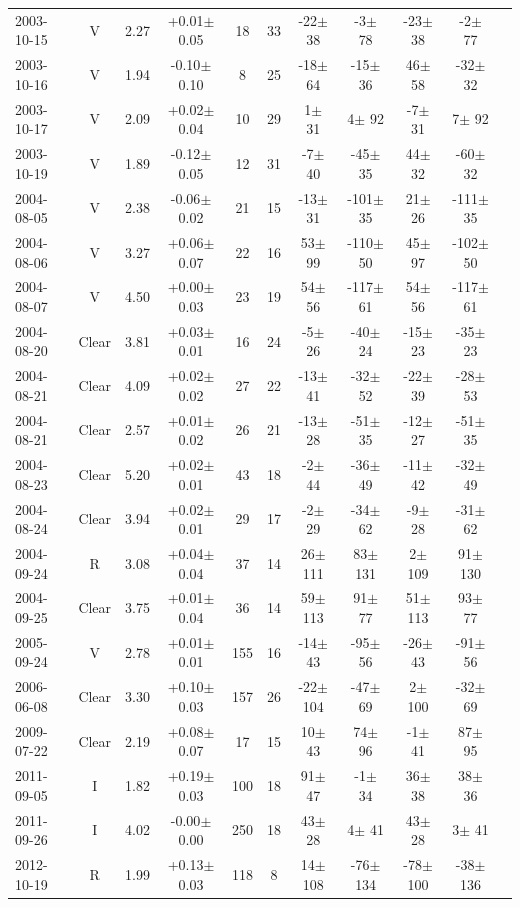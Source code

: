 \documentclass[12pt,a4paper]{report}
\begin{document}
\begin{landscape}
\begin{longtable}{|l|c|c|c|c|c|c|c|c|c|c|}
2003-10-15 & V     & 2.27 & +0.01$\pm$0.05 &  18 &  33 &  -22$\pm$ 38 &   -3$\pm$ 78 &  -23$\pm$ 38 &   -2$\pm$ 77 \\ 
2003-10-16 & V     & 1.94 & -0.10$\pm$0.10 &   8 &  25 &  -18$\pm$ 64 &  -15$\pm$ 36 &   46$\pm$ 58 &  -32$\pm$ 32 \\ 
2003-10-17 & V     & 2.09 & +0.02$\pm$0.04 &  10 &  29 &    1$\pm$ 31 &    4$\pm$ 92 &   -7$\pm$ 31 &    7$\pm$ 92 \\ 
2003-10-19 & V     & 1.89 & -0.12$\pm$0.05 &  12 &  31 &   -7$\pm$ 40 &  -45$\pm$ 35 &   44$\pm$ 32 &  -60$\pm$ 32 \\ 
2004-08-05 & V     & 2.38 & -0.06$\pm$0.02 &  21 &  15 &  -13$\pm$ 31 & -101$\pm$ 35 &   21$\pm$ 26 & -111$\pm$ 35 \\ 
2004-08-06 & V     & 3.27 & +0.06$\pm$0.07 &  22 &  16 &   53$\pm$ 99 & -110$\pm$ 50 &   45$\pm$ 97 & -102$\pm$ 50 \\ 
2004-08-07 & V     & 4.50 & +0.00$\pm$0.03 &  23 &  19 &   54$\pm$ 56 & -117$\pm$ 61 &   54$\pm$ 56 & -117$\pm$ 61 \\ 
2004-08-20 & Clear & 3.81 & +0.03$\pm$0.01 &  16 &  24 &   -5$\pm$ 26 &  -40$\pm$ 24 &  -15$\pm$ 23 &  -35$\pm$ 23 \\ 
2004-08-21 & Clear & 4.09 & +0.02$\pm$0.02 &  27 &  22 &  -13$\pm$ 41 &  -32$\pm$ 52 &  -22$\pm$ 39 &  -28$\pm$ 53 \\ 
2004-08-21 & Clear & 2.57 & +0.01$\pm$0.02 &  26 &  21 &  -13$\pm$ 28 &  -51$\pm$ 35 &  -12$\pm$ 27 &  -51$\pm$ 35 \\ 
2004-08-23 & Clear & 5.20 & +0.02$\pm$0.01 &  43 &  18 &   -2$\pm$ 44 &  -36$\pm$ 49 &  -11$\pm$ 42 &  -32$\pm$ 49 \\ 
2004-08-24 & Clear & 3.94 & +0.02$\pm$0.01 &  29 &  17 &   -2$\pm$ 29 &  -34$\pm$ 62 &   -9$\pm$ 28 &  -31$\pm$ 62 \\ 
2004-09-24 & R     & 3.08 & +0.04$\pm$0.04 &  37 &  14 &   26$\pm$111 &   83$\pm$131 &    2$\pm$109 &   91$\pm$130 \\ 
2004-09-25 & Clear & 3.75 & +0.01$\pm$0.04 &  36 &  14 &   59$\pm$113 &   91$\pm$ 77 &   51$\pm$113 &   93$\pm$ 77 \\ 
2005-09-24 & V     & 2.78 & +0.01$\pm$0.01 & 155 &  16 &  -14$\pm$ 43 &  -95$\pm$ 56 &  -26$\pm$ 43 &  -91$\pm$ 56 \\ 
2006-06-08 & Clear & 3.30 & +0.10$\pm$0.03 & 157 &  26 &  -22$\pm$104 &  -47$\pm$ 69 &    2$\pm$100 &  -32$\pm$ 69 \\ 
2009-07-22 & Clear & 2.19 & +0.08$\pm$0.07 &  17 &  15 &   10$\pm$ 43 &   74$\pm$ 96 &   -1$\pm$ 41 &   87$\pm$ 95 \\ 
2011-09-05 & I     & 1.82 & +0.19$\pm$0.03 & 100 &  18 &   91$\pm$ 47 &   -1$\pm$ 34 &   36$\pm$ 38 &   38$\pm$ 36 \\ 
2011-09-26 & I     & 4.02 & -0.00$\pm$0.00 & 250 &  18 &   43$\pm$ 28 &    4$\pm$ 41 &   43$\pm$ 28 &    3$\pm$ 41 \\ 
2012-10-19 & R     & 1.99 & +0.13$\pm$0.03 & 118 &   8 &   14$\pm$108 &  -76$\pm$134 &  -78$\pm$100 &  -38$\pm$136 \\ 
\hline
\end{longtable}


\end{landscape}
\end{document}
